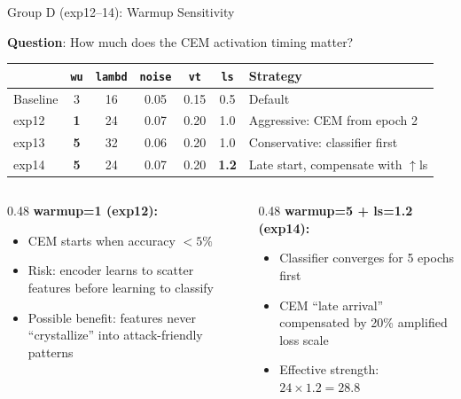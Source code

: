 \documentclass[aspectratio=169, 10pt]{beamer}
\newcommand{\param}[1]{\textcolor{paramred}{\texttt{#1}}}
\begin{document}
\begin{frame}{Group D (exp12--14): Warmup Sensitivity}

\textbf{Question}: How much does the CEM activation timing matter?

\vspace{0.2cm}
\begin{center}
\small
\begin{tabular}{lcccccl}
\toprule
& \param{wu} & \param{lambd} & \param{noise} & \param{vt} & \param{ls} & \textbf{Strategy} \\
\midrule
\rowcolor{lightgray}
Baseline & 3 & 16 & 0.05 & 0.15 & 0.5 & Default \\
exp12 & \textbf{1} & 24 & 0.07 & 0.20 & 1.0 & Aggressive: CEM from epoch 2 \\
exp13 & \textbf{5} & 32 & 0.06 & 0.20 & 1.0 & Conservative: classifier first \\
exp14 & \textbf{5} & 24 & 0.07 & 0.20 & \textbf{1.2} & Late start, compensate with $\uparrow$ls \\
\bottomrule
\end{tabular}
\end{center}

\vspace{0.3cm}
\begin{columns}[T]
\begin{column}{0.48\textwidth}
\textbf{warmup=1 (exp12):}
\begin{itemize}
    \item CEM starts when accuracy $<5\%$
    \item Risk: encoder learns to scatter features before learning to classify
    \item Possible benefit: features never ``crystallize'' into attack-friendly patterns
\end{itemize}
\end{column}
\begin{column}{0.48\textwidth}
\textbf{warmup=5 + ls=1.2 (exp14):}
\begin{itemize}
    \item Classifier converges for 5 epochs first
    \item CEM ``late arrival'' compensated by 20\% amplified loss scale
    \item Effective strength: $24 \times 1.2 = 28.8$
\end{itemize}
\end{column}
\end{columns}

\end{frame}
\end{document}
